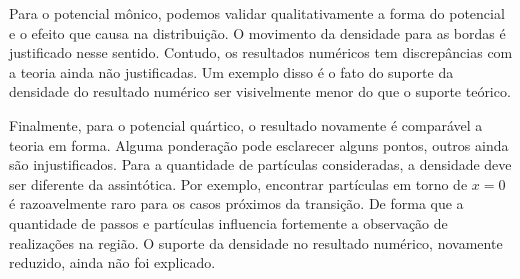 Para o potencial mônico, podemos validar qualitativamente a forma do potencial e o efeito que causa na distribuição. O movimento da densidade para as bordas é justificado nesse sentido. Contudo, os resultados numéricos tem discrepâncias com a teoria ainda não justificadas. Um exemplo disso é o fato do suporte da densidade do resultado numérico ser visivelmente menor do que o suporte teórico.

Finalmente, para o potencial quártico, o resultado novamente é comparável a teoria em forma. Alguma ponderação pode esclarecer alguns pontos, outros ainda são injustificados. Para a quantidade de partículas consideradas, a densidade deve ser diferente da assintótica. Por exemplo, encontrar partículas em torno de $x=0$ é razoavelmente raro para os casos próximos da transição. De forma que a quantidade de passos e partículas influencia fortemente a observação de realizações na região. O suporte da densidade no resultado numérico, novamente reduzido, ainda não foi explicado.

